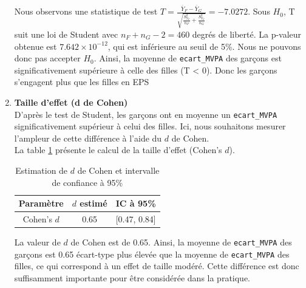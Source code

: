 \documentclass[12pt,a4paper]{article}
\begin{document}
\begin{enumerate}[label=\textbf{\alph*})]
	Nous observons une statistique de test $T = \frac{\overline{Y}_F - \overline{Y}_G}{\sqrt{\frac{S_{Y_F}^2}{n_F} + \frac{S_{Y_G}^2}{n_G}}} = -7.0272$. Sous $H_0$, T suit une loi de Student avec $n_F + n_G - 2 = 460$ degrés de liberté. La p-valeur obtenue est $7.642 \times 10^{-12}$, qui est inférieure au seuil de 5\%. Nous ne pouvons donc pas accepter $H_0$. Ainsi, la moyenne de \texttt{ecart\_MVPA} des garçons est significativement supérieure à celle des filles (T < 0). Donc les garçons s'engagent plus que les filles en EPS\\

	
	\noindent
	\item \textbf{Taille d'effet (d de Cohen)} \\
	
	D'après le test de Student, les garçons ont en moyenne un \texttt{ecart\_MVPA} significativement supérieur à celui des filles. Ici, nous souhaitons mesurer l'ampleur de cette différence à l'aide du \(d\) de Cohen. \\
	La table \ref{effect_size_1} présente le calcul de la taille d'effet (Cohen's \(d\)). 
	\begin{table}[H]
		\centering
		\caption{Estimation de \(d\) de Cohen et intervalle de confiance à 95\%}
		\begin{tabular}{ccc}
			\toprule
			Paramètre & \(d\) estimé & IC à 95\% \\
			\midrule
			Cohen's \(d\) & 0.65 & [0.47, 0.84] \\
			\bottomrule
		\end{tabular}
		\label{effect_size_1}
	\end{table}
	
	La valeur de \(d\) de Cohen est de 0.65. Ainsi, la moyenne de \texttt{ecart\_MVPA} des garçons est 0.65 écart-type plus élevée que la moyenne de \texttt{ecart\_MVPA} des filles, ce qui correspond à un effet de taille modéré. Cette différence est donc suffisamment importante pour être considérée dans la pratique.
	
\end{enumerate}
\end{document}
